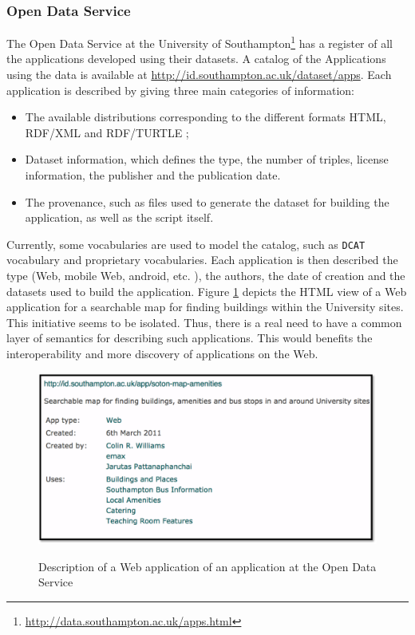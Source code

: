 \subsubsection{Open Data Service}
The Open Data Service at the University of Southampton\footnote{\url{http://data.southampton.ac.uk/apps.html}} has a register of all the applications developed using their datasets. A catalog of the Applications using the data is available at \url{http://id.southampton.ac.uk/dataset/apps}. Each application is described by giving three main categories of information:
\begin{itemize}
\item The available distributions corresponding to the different formats HTML, RDF/XML and RDF/TURTLE ;
\item Dataset information, which defines the type, the number of triples, license information, the publisher and the publication date.
\item The provenance, such as files used to generate the dataset for building the application, as well as the script itself.
\end{itemize} 

Currently, some vocabularies are used to model the catalog, such as \texttt{DCAT} vocabulary \cite{dcat} and proprietary vocabularies. Each application is then described the type (Web, mobile Web, android, etc. ), the authors, the date of creation and the datasets used to build the application. Figure \ref{fig:app-amenity} depicts the HTML view of a Web application
for a searchable map for finding buildings within the University sites. This initiative seems to be isolated. Thus, there is a real need to have a common layer of semantics for describing such applications. This would benefits the interoperability and more discovery of applications on the Web.
\begin{figure}
\includegraphics[scale=.7]{img/soton-map-amenities.pdf}
\label{fig:app-amenity}
\vspace{-10pt}
\caption{Description of a Web application of an application at the Open Data Service}
\end{figure}

